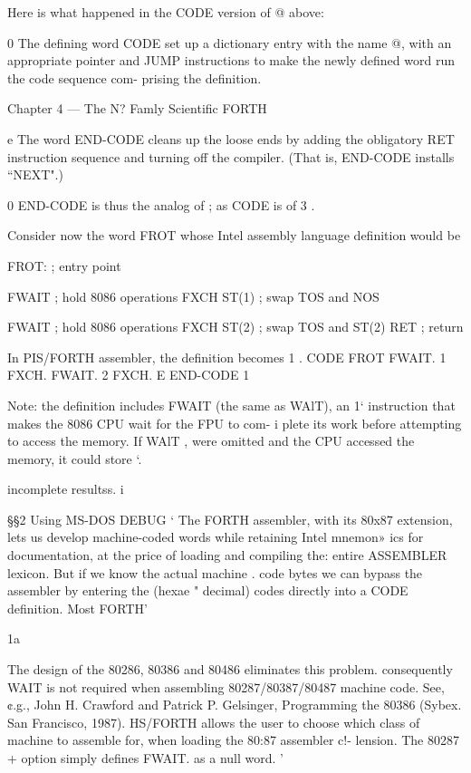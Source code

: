{{Here is what happened in the CODE version of @ above:

0 The defining word CODE set up a dictionary entry with the
name @, with an appropriate pointer and JUMP instructions
to make the newly defined word run the code sequence com-
prising the definition.

 







Chapter 4 — The N? Famly Scientific FORTH

e The word END-CODE cleans up the loose ends by adding
the obligatory RET instruction sequence and turning off the
compiler. (That is, END-CODE installs “NEXT".)

0 END-CODE is thus the analog of ; as CODE is of 3 .

Consider now the word FROT whose Intel assembly language
definition would be

FROT: ; entry point

FWAIT ; hold 8086 operations
FXCH ST(1) ; swap TOS and NOS

FWAIT ; hold 8086 operations
FXCH ST(2) ; swap TOS and ST(2)
RET ; return

In PIS/FORTH assembler, the definition becomes 1 .
CODE FROT FWAIT. 1 FXCH. FWAIT. 2 FXCH. E
END-CODE 1

Note: the definition includes FWAIT (the same as WAlT), an 1‘
instruction that makes the 8086 CPU wait for the FPU to com- i
plete its work before attempting to access the memory. If WAlT ,
were omitted and the CPU accessed the memory, it could store ‘.

incomplete resultss. i

 

§§2 Using MS-DOS DEBUG ‘
The FORTH assembler, with its 80x87 extension, lets us
develop machine-coded words while retaining Intel mnemon»
ics for documentation, at the price of loading and compiling the:
entire ASSEMBLER lexicon. But if we know the actual machine .
code bytes we can bypass the assembler by entering the (hexae "
decimal) codes directly into a CODE definition. Most FORTH’

 

1a

The design of the 80286, 80386 and 80486 eliminates this problem. consequently WAIT is not
required when assembling 80287/80387/80487 machine code. See, ¢.g., John H. Crawford and
Patrick P. Gelsinger, Programming the 80386 (Sybex. San Francisco, 1987). HS/FORTH allows
the user to choose which class of machine to assemble for, when loading the 80:87 assembler c!-
lension. The 80287 + option simply defines FWAIT. as a null word. '

}}
